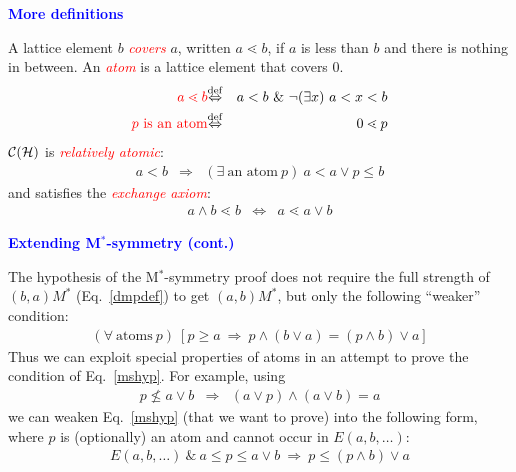 \documentclass{slides}
\begin{document}
\begin{slide}

\begin{center}
\textcolor{blue}{\textbf{More definitions}}
\end{center}


A lattice element $b$ \textcolor{red}{\textit{covers}} $a$, written $a\lessdot
b$, if $a$ is less than $b$ and there is nothing in between.  An
\textcolor{red}{\textit{atom}} is a lattice element that covers $0$.
\begin{eqnarray}
\textcolor{red}{a\lessdot b} & {\buildrel\rm def\over \Leftrightarrow}&
a<b \ \&\ \lnot (\exists x)\ a<x<b \\
\textcolor{red}{p\ \mbox{is an atom}} & {\buildrel\rm def\over \Leftrightarrow}&
0\lessdot p
\end{eqnarray}
${\cal C}({\cal H})$ is
\textcolor{red}{\textit{relatively atomic}}:
\begin{eqnarray}
a<b & \Rightarrow & (\exists\ \mbox{an atom}\ p)\
a< a\vee p \le b
\end{eqnarray}
and satisfies the
\textcolor{red}{\textit{exchange axiom}}:
\begin{eqnarray}
a\wedge b\lessdot b & \Leftrightarrow & a\lessdot a\vee b
\end{eqnarray}


\end{slide}
\begin{slide}

\begin{center}
\textcolor{blue}{\textbf{Extending M${}^*$-symmetry (cont.)}}
\end{center}

The hypothesis of the M${}^*$-symmetry proof
 does not require the full strength
of $(b,a)M^*$ (Eq.~\ref{dmpdef}) to get $(a,b)M^*$,
 but only the following ``weaker''
condition:
\begin{eqnarray}
  (\forall \ \mbox{atoms}\ p)\
  [ p \ge a \ \Rightarrow\  p \wedge (b \vee a) = (p \wedge b) \vee a]
\end{eqnarray}
Thus we can exploit special properties of atoms in an attempt to prove
the condition of Eq.~\ref{mshyp}.  For example, using
\begin{eqnarray}
p\nleq a\vee b &  \Rightarrow & (a\vee p)\wedge (a\vee b) = a
\end{eqnarray}
we can weaken  Eq.~\ref{mshyp} (that we want to prove)
into the following form, where $p$ is (optionally)
an atom and cannot
occur in $E(a,b,\ldots )$:
\begin{eqnarray}
E(a,b,\ldots ) \ \&\ a\le p\le a\vee b \ \Rightarrow \ p\le (p\wedge b)\vee a
\end{eqnarray}




\end{slide}
\end{document}
